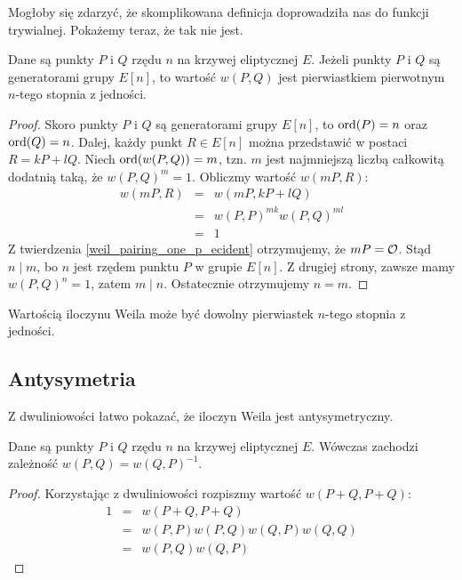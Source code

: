 \noindent
Mogłoby się zdarzyć, że skomplikowana definicja doprowadziła nas
do funkcji trywialnej.
Pokażemy teraz, że tak nie jest.

\begin{theorem}
Dane są punkty $P$ i $Q$ rzędu $n$ na krzywej eliptycznej $E$.
Jeżeli punkty $P$ i $Q$ są generatorami grupy $E[n]$,
to wartość $w(P, Q)$ jest pierwiastkiem pierwotnym $n$-tego stopnia z jedności.
\end{theorem}

\begin{proof}
Skoro punkty $P$ i $Q$ są generatorami grupy $E[n]$,
to $\operatorname{ord}(P) = n$ oraz $\operatorname{ord}(Q) = n$.
Dalej, każdy punkt $R \in E[n]$ można przedstawić w postaci $R = kP + lQ$.
Niech $\operatorname{ord}(w(P,Q)) = m$,
tzn. $m$ jest najmniejszą liczbą całkowitą dodatnią taką,
że $w(P,Q)^m = 1$.
Obliczmy wartość $w(mP, R)$:
\begin{eqnarray*}
w(mP, R)
& = & w(mP, kP + lQ) \\
& = & w(P,P)^{mk}w(P,Q)^{ml} \\
& = & 1
\end{eqnarray*}
Z twierdzenia \ref{weil_pairing_one_p_ecident} otrzymujemy,
że $mP = \mathcal{O}$. Stąd $n \mid m$, bo $n$ jest rzędem punktu $P$
w grupie $E[n]$. Z drugiej strony, zawsze mamy $w(P, Q)^n = 1$,
zatem $m \mid n$. Ostatecznie otrzymujemy $n = m$.
\end{proof}

\begin{corollary}
Wartością iloczynu Weila
może być dowolny pierwiastek $n$-tego stopnia z jedności.
\end{corollary}

\subsection*{Antysymetria}

\noindent
Z dwuliniowości łatwo pokazać, że iloczyn Weila jest antysymetryczny.

\begin{theorem}
Dane są punkty $P$ i $Q$ rzędu $n$ na krzywej eliptycznej $E$.
Wówczas zachodzi zależność $w(P, Q) = w(Q, P)^{-1}$.
\end{theorem}

\begin{proof}
Korzystając z dwuliniowości rozpiszmy wartość $w(P + Q, P + Q)$:
\begin{eqnarray*}
1
& = & w(P + Q, P + Q) \\
& = & w(P,P)w(P,Q)w(Q,P)w(Q,Q) \\
& = & w(P, Q)w(Q, P)
\end{eqnarray*}
\end{proof}
